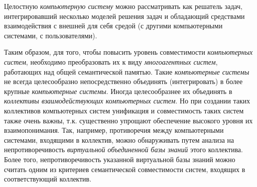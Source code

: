 \begin{SCn}
\begin{scnsubstruct}
{	Целостную \textit{компьютерную систему} можно рассматривать как решатель задач, интегрировавший несколько моделей решения задач и обладающий средствами взаимодействия с внешней для себя средой (с другими компьютерными системами, с пользователями).
	
	Таким образом, для того, чтобы повысить уровень совместимости \textit{компьютерных систем}, необходимо преобразовать их к виду \textit{многоагентных систем}, работающих над общей семантической памятью. Такие \textit{компьютерные системы} не всегда целесообразно непосредственно объединять (интегрировать) в более крупные \textit{компьютерные системы}. Иногда целесообразнее их объединять в \textit{коллективы взаимодействующих компьютерных систем}. Но при создании таких коллективов компьютерных систем унификация и совместимость таких систем также очень важны, т.к. существенно упрощают обеспечение высокого уровня их взаимопонимания. Так, например, противоречия между компьютерными системами, входящими в коллектив, можно обнаруживать путем анализа на непротиворечивость \textit{виртуальной объединенной базы знаний} этого коллектива. Более того, непротиворечивость указанной виртуальной базы знаний можно считать одним из критериев семантической совместимости систем, входящих в соответствующий коллектив.}

\end{scnsubstruct}
\end{SCn}

